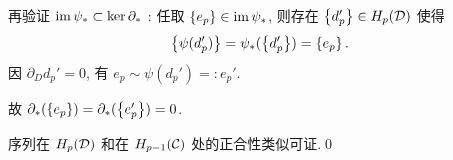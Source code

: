 \begin{Proof}
	再验证 $ \mathrm{im}\,\psi_*\subset\ker\partial_* $ : 任取 $ \left\{ e_p \right\}\in\mathrm{im}\,\psi_* $, 则存在 $ \left\{ d_p' \right\}\in H_p(\mathcal{D}) $ 使得
	\[
		\left\{ \psi(d_p') \right\}=\psi_*(\left\{ d_p' \right\})=\left\{ e_p \right\}.
	\]
	因 $ \partial_D d_p'=0 $, 有 $ e_p\sim\psi(d_p')=:e_p' $.
	\begin{center}
	\end{center}
	故 $ \partial_*(\left\{ e_p \right\})=\partial_*(\left\{ e_p' \right\})=0 $.

	序列在 $ H_p(\mathcal{D}) $ 和在 $ H_{p-1}(\mathcal{C}) $ 处的正合性类似可证.\qed
\end{Proof}

